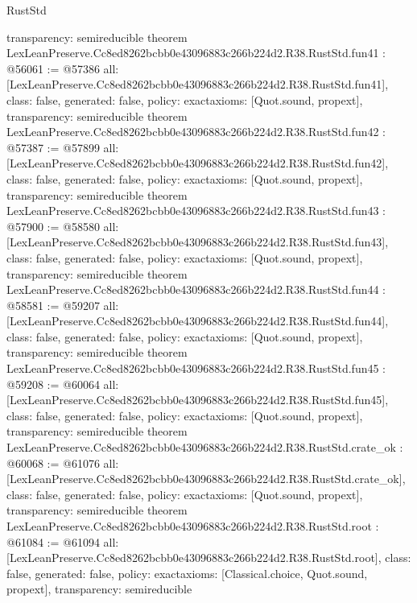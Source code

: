 \begin{lexlean}{RustStd}
\begin{coremodule}
{  transparency: semireducible
}
theorem LexLeanPreserve.Cc8ed8262bcbb0e43096883c266b224d2.R38.RustStd.fun41 : @56061 := @57386 {
  all: [LexLeanPreserve.Cc8ed8262bcbb0e43096883c266b224d2.R38.RustStd.fun41],
  class: false,
  generated: false,
  policy: exact{axioms: [Quot.sound, propext]},
  transparency: semireducible
}
theorem LexLeanPreserve.Cc8ed8262bcbb0e43096883c266b224d2.R38.RustStd.fun42 : @57387 := @57899 {
  all: [LexLeanPreserve.Cc8ed8262bcbb0e43096883c266b224d2.R38.RustStd.fun42],
  class: false,
  generated: false,
  policy: exact{axioms: [Quot.sound, propext]},
  transparency: semireducible
}
theorem LexLeanPreserve.Cc8ed8262bcbb0e43096883c266b224d2.R38.RustStd.fun43 : @57900 := @58580 {
  all: [LexLeanPreserve.Cc8ed8262bcbb0e43096883c266b224d2.R38.RustStd.fun43],
  class: false,
  generated: false,
  policy: exact{axioms: [Quot.sound, propext]},
  transparency: semireducible
}
theorem LexLeanPreserve.Cc8ed8262bcbb0e43096883c266b224d2.R38.RustStd.fun44 : @58581 := @59207 {
  all: [LexLeanPreserve.Cc8ed8262bcbb0e43096883c266b224d2.R38.RustStd.fun44],
  class: false,
  generated: false,
  policy: exact{axioms: [Quot.sound, propext]},
  transparency: semireducible
}
theorem LexLeanPreserve.Cc8ed8262bcbb0e43096883c266b224d2.R38.RustStd.fun45 : @59208 := @60064 {
  all: [LexLeanPreserve.Cc8ed8262bcbb0e43096883c266b224d2.R38.RustStd.fun45],
  class: false,
  generated: false,
  policy: exact{axioms: [Quot.sound, propext]},
  transparency: semireducible
}
theorem LexLeanPreserve.Cc8ed8262bcbb0e43096883c266b224d2.R38.RustStd.crate_ok : @60068 := @61076 {
  all: [LexLeanPreserve.Cc8ed8262bcbb0e43096883c266b224d2.R38.RustStd.crate_ok],
  class: false,
  generated: false,
  policy: exact{axioms: [Quot.sound, propext]},
  transparency: semireducible
}
theorem LexLeanPreserve.Cc8ed8262bcbb0e43096883c266b224d2.R38.RustStd.root : @61084 := @61094 {
  all: [LexLeanPreserve.Cc8ed8262bcbb0e43096883c266b224d2.R38.RustStd.root],
  class: false,
  generated: false,
  policy: exact{axioms: [Classical.choice, Quot.sound, propext]},
  transparency: semireducible
}


\end{coremodule}
\end{lexlean}
